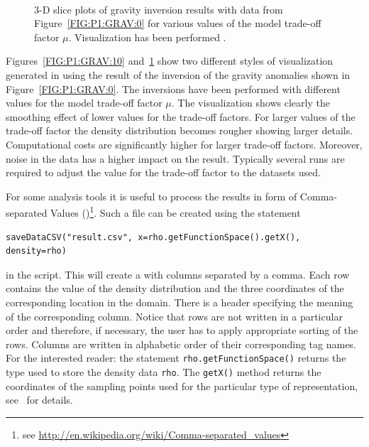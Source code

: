 \begin{figure}
\begin{center}
{        }\\ %
    \end{center}
    \caption{3-D slice plots of gravity inversion results with data from
    Figure~\ref{FIG:P1:GRAV:0} for various values of the model trade-off
    factor $\mu$. Visualization has been performed \VisIt.%
    }
    \label{FIG:P1:GRAV:11}
\end{figure}

Figures~\ref{FIG:P1:GRAV:10} and~\ref{FIG:P1:GRAV:11} show two different
styles of visualization generated in \VisIt using the result of the inversion
of the gravity anomalies shown in Figure~\ref{FIG:P1:GRAV:0}.
The inversions have been performed with different values for the model
trade-off factor $\mu$.
The visualization shows clearly the smoothing effect of lower values for the
trade-off factors.
For larger values of the trade-off factor the density distribution becomes
rougher showing larger details.
Computational costs are significantly higher for larger trade-off factors.
Moreover, noise in the data has a higher impact on the result.
Typically several runs are required to adjust the value for the trade-off
factor to the datasets used.

For some analysis tools it is useful to process the results in form of
Comma-separated Values (\CSV)\footnote{see 
\url{http://en.wikipedia.org/wiki/Comma-separated_values}}.
Such a file can be created using the statement
\begin{verbatim}
saveDataCSV("result.csv", x=rho.getFunctionSpace().getX(), density=rho)
\end{verbatim}
in the script.
This will create a  with columns separated by a comma.
Each row contains the value of the density distribution and the three
coordinates of the corresponding location in the domain.
There is a header specifying the meaning of the corresponding column.
Notice that rows are not written in a particular order and therefore, if
necessary, the user has to apply appropriate sorting of the rows.
Columns are written in alphabetic order of their corresponding tag names.
For the interested reader: the statement \verb|rho.getFunctionSpace()| returns
the type used to store the density data \verb|rho|.
The \verb|getX()| method returns the coordinates of the sampling points used
for the particular type of representation, see~\cite{ESCRIPT} for details. 

